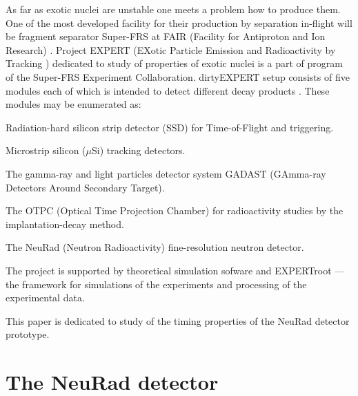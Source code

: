 \documentclass{webofc}
\begin{document}
As far as exotic nuclei are unstable one meets a problem how to produce them.
One of the most developed facility for their production by separation in-flight will be fragment separator Super-FRS at FAIR (Facility for Antiproton and Ion Research) \cite{diplom}. Project EXPERT (EXotic Particle Emission and Radioactivity by Tracking \cite{IMexpert}) dedicated to study of properties of exotic nuclei is a part of program of the Super-FRS Experiment Collaboration. dirtyEXPERT setup consists of five modules each of which is intended to detect different decay products \cite{tdr}.
These modules may be enumerated as:
\begin{inparaenum}[(i)]
	\item Radiation-hard silicon strip detector (SSD) for Time-of-Flight and triggering.
	\item Microstrip silicon ($\mu$Si) tracking detectors.
	\item The gamma-ray and light particles detector system GADAST (GAmma-ray Detectors Around Secondary Target).
	\item The OTPC (Optical Time Projection Chamber) for radioactivity studies by the implantation-decay method.
	\item The NeuRad (Neutron Radioactivity) fine-resolution neutron detector.
\end{inparaenum}

The project is supported by theoretical simulation sofware and EXPERTroot \cite{er} --- the framework for simulations of the experiments and processing of the experimental data. 

This paper is dedicated to study of the timing properties of the NeuRad detector prototype.

\section{The NeuRad detector}
\end{document}
